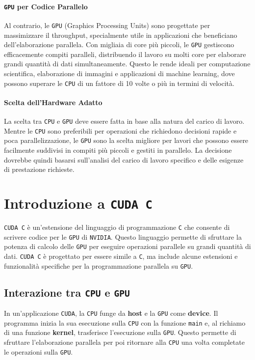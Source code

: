 \paragraph{\texttt{GPU} per Codice Parallelo}
Al contrario, le \texttt{GPU} (Graphics Processing Units) sono progettate
per massimizzare il throughput, specialmente utile in applicazioni che
beneficiano dell'elaborazione parallela. Con migliaia di core più piccoli,
le \texttt{GPU} gestiscono efficacemente compiti paralleli, distribuendo
il lavoro su molti core per elaborare grandi quantità di dati simultaneamente.
Questo le rende ideali per computazione scientifica, elaborazione di immagini
e applicazioni di machine learning, dove possono superare le \texttt{CPU} di
un fattore di 10 volte o più in termini di velocità.

\paragraph{Scelta dell'Hardware Adatto}
La scelta tra \texttt{CPU} e \texttt{GPU} deve essere fatta in base alla
natura del carico di lavoro. Mentre le \texttt{CPU} sono preferibili per
operazioni che richiedono decisioni rapide e poca parallelizzazione, le
\texttt{GPU} sono la scelta migliore per lavori che possono essere facilmente
suddivisi in compiti più piccoli e gestiti in parallelo. La decisione dovrebbe
quindi basarsi sull'analisi del carico di lavoro specifico e delle esigenze di
prestazione richieste.

\section{Introduzione a \texttt{CUDA C}}
\texttt{CUDA C} è un'estensione del linguaggio di programmazione \texttt{C} che
consente di scrivere codice per le \texttt{GPU} di \texttt{NVIDIA}. Questo
linguaggio permette di sfruttare la potenza di calcolo delle \texttt{GPU} per
eseguire operazioni parallele su grandi quantità di dati. \texttt{CUDA C} è
progettato per essere simile a \texttt{C}, ma include alcune estensioni e
funzionalità specifiche per la programmazione parallela su \texttt{GPU}.



\subsection{Interazione tra \texttt{CPU} e \texttt{GPU}}

In un'applicazione \texttt{CUDA}, la \texttt{CPU} funge da \textbf{host} e
la \texttt{GPU} come \textbf{device}. Il programma inizia la sua esecuzione
sulla \texttt{CPU} con la funzione \texttt{main} e, al richiamo di una
funzione \textbf{kernel}, trasferisce l'esecuzione sulla \texttt{GPU}.
Questo permette di sfruttare l'elaborazione parallela per poi ritornare
alla \texttt{CPU} una volta completate le operazioni sulla \texttt{GPU}.

